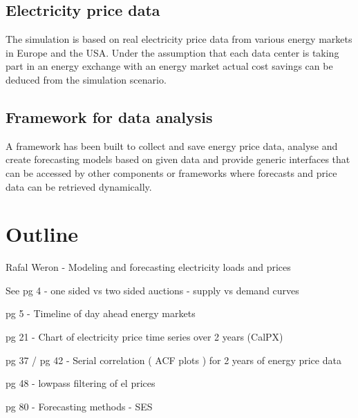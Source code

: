 \documentclass[paper=a4, fontsize=11pt]{scrartcl} %
\numberwithin{equation}{section} %
\numberwithin{figure}{section} %
\numberwithin{table}{section} %
\begin{document}

\subsection{Electricity price data}

The simulation is based on real electricity price data from various energy markets in Europe and the USA. Under the assumption that each data center is taking part in an energy exchange with an energy market actual cost savings can be deduced from the simulation scenario. 


\subsection{Framework for data analysis}

A framework has been built to collect and save energy price data, analyse and create forecasting models based on given data and provide generic interfaces that can be accessed by other components or frameworks where forecasts and price data can be retrieved dynamically. 




\section{Outline}



Rafal Weron - Modeling and forecasting electricity loads and prices



See pg 4 - one sided vs two sided auctions - supply vs demand curves

pg 5 - Timeline of day ahead energy markets


pg 21 - Chart of electricity price time series over 2 years (CalPX)


pg 37 / pg 42 - Serial correlation ( ACF plots ) for 2 years of energy price data

pg 48 - lowpass filtering of el prices

pg 80 - Forecasting methods - SES
\end{document}
